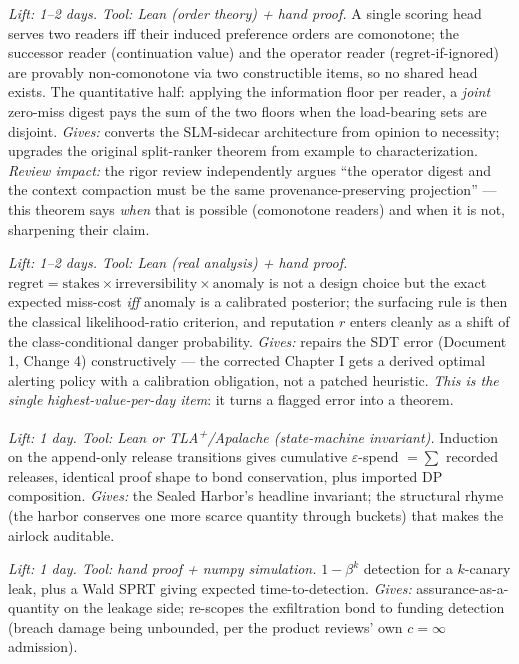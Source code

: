 \documentclass[11pt,a4paper]{article}
\begin{document}
\begin{description}[leftmargin=0em,style=unboxed]
\item[A1. Split-Digest Theorem.] \emph{Lift: 1--2 days. Tool: Lean (order theory) + hand proof.} A single scoring head serves two readers iff their induced preference orders are comonotone; the successor reader (continuation value) and the operator reader (regret-if-ignored) are provably non-comonotone via two constructible items, so no shared head exists. The quantitative half: applying the information floor per reader, a \emph{joint} zero-miss digest pays the sum of the two floors when the load-bearing sets are disjoint. \emph{Gives:} converts the SLM-sidecar architecture from opinion to necessity; upgrades the original split-ranker theorem from example to characterization. \emph{Review impact:} the rigor review independently argues ``the operator digest and the context compaction must be the same provenance-preserving projection'' --- this theorem says \emph{when} that is possible (comonotone readers) and when it is not, sharpening their claim.

\item[A2. Deriving the regret head.] \emph{Lift: 1--2 days. Tool: Lean (real analysis) + hand proof.} $\mathrm{regret}=\text{stakes}\times\text{irreversibility}\times\text{anomaly}$ is not a design choice but the exact expected miss-cost \emph{iff} anomaly is a calibrated posterior; the surfacing rule is then the classical likelihood-ratio criterion, and reputation $r$ enters cleanly as a shift of the class-conditional danger probability. \emph{Gives:} repairs the SDT error (Document 1, Change 4) constructively --- the corrected Chapter I gets a derived optimal alerting policy with a calibration obligation, not a patched heuristic. \emph{This is the single highest-value-per-day item}: it turns a flagged error into a theorem.

\item[A3. $\varepsilon$-conservation for the release ledger.] \emph{Lift: 1 day. Tool: Lean or TLA\textsuperscript{+}/Apalache (state-machine invariant).} Induction on the append-only release transitions gives cumulative $\varepsilon$-spend $=\sum$ recorded releases, identical proof shape to bond conservation, plus imported DP composition. \emph{Gives:} the Sealed Harbor's headline invariant; the structural rhyme (the harbor conserves one more scarce quantity through buckets) that makes the airlock auditable.

\item[A4. Canary detection power + sequential leak testing.] \emph{Lift: 1 day. Tool: hand proof + numpy simulation.} $1-\beta^k$ detection for a $k$-canary leak, plus a Wald SPRT giving expected time-to-detection. \emph{Gives:} assurance-as-a-quantity on the leakage side; re-scopes the exfiltration bond to funding detection (breach damage being unbounded, per the product reviews' own $c=\infty$ admission).


\end{description}
\end{document}
